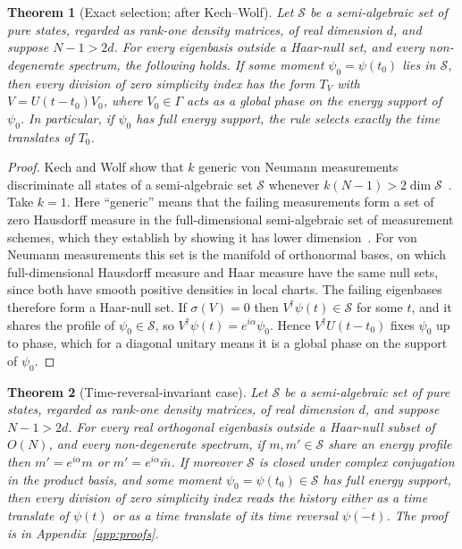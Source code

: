 \documentclass[11pt]{article}
\newtheorem{theorem}{Theorem}
\theoremstyle{definition}
\theoremstyle{remark}
\begin{document}
\begin{theorem}[Exact selection; after Kech--Wolf]\label{thm:exact}
Let $\mathcal S$ be a semi-algebraic set of pure states, regarded as rank-one density matrices, of real dimension $d$, and suppose $N-1>2d$. For every eigenbasis outside a Haar-null set, and every non-degenerate spectrum, the following holds. If some moment $\psi_0=\psi(t_0)$ lies in $\mathcal S$, then every division of zero simplicity index has the form $T_V$ with $V=U(t-t_0)V_0$, where $V_0\in\Gamma$ acts as a global phase on the energy support of $\psi_0$. In particular, if $\psi_0$ has full energy support, the rule selects exactly the time translates of $T_0$.
\end{theorem}
\begin{proof}
Kech and Wolf show that $k$ generic von Neumann measurements discriminate all states of a semi-algebraic set $\mathcal S$ whenever $k(N-1)>2\dim\mathcal S$~\cite{KechWolf2017}. Take $k=1$. Here ``generic'' means that the failing measurements form a set of zero Hausdorff measure in the full-dimensional semi-algebraic set of measurement schemes, which they establish by showing it has lower dimension~\cite[App.~A]{KechWolf2017}. For von Neumann measurements this set is the manifold of orthonormal bases, on which full-dimensional Hausdorff measure and Haar measure have the same null sets, since both have smooth positive densities in local charts. The failing eigenbases therefore form a Haar-null set. If $\sigma(V)=0$ then $V^\dagger\psi(t)\in\mathcal S$ for some $t$, and it shares the profile of $\psi_0\in\mathcal S$, so $V^\dagger\psi(t)=e^{i\alpha}\psi_0$. Hence $V^\dagger U(t-t_0)$ fixes $\psi_0$ up to phase, which for a diagonal unitary means it is a global phase on the support of $\psi_0$.
\end{proof}

\begin{theorem}[Time-reversal-invariant case]\label{thm:exactTR}
Let $\mathcal S$ be a semi-algebraic set of pure states, regarded as rank-one density matrices, of real dimension $d$, and suppose $N-1>2d$. For every real orthogonal eigenbasis outside a Haar-null subset of $O(N)$, and every non-degenerate spectrum, if $m,m'\in\mathcal S$ share an energy profile then $m'=e^{i\alpha}m$ or $m'=e^{i\alpha}\bar m$. If moreover $\mathcal S$ is closed under complex conjugation in the product basis, and some moment $\psi_0=\psi(t_0)\in\mathcal S$ has full energy support, then every division of zero simplicity index reads the history either as a time translate of $\psi(t)$ or as a time translate of its time reversal $\overline{\psi(-t)}$. The proof is in Appendix~\ref{app:proofs}.
\end{theorem}
\end{document}
